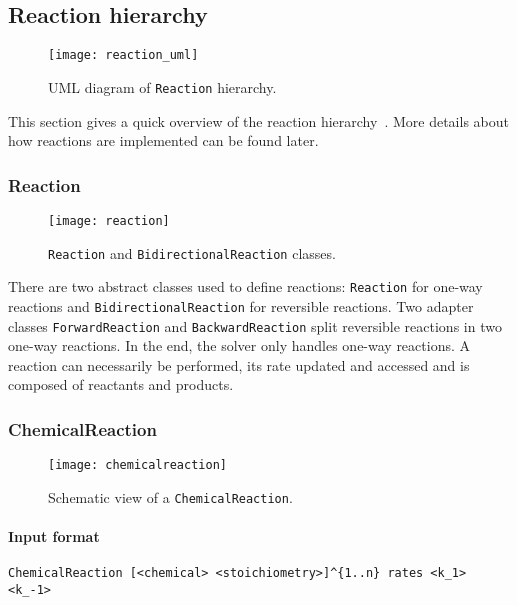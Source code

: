 
\subsection{Reaction hierarchy}

\begin{figure}[!h]
  \centering
  \texttt{[image: reaction\_uml]}
  \caption{UML diagram of \texttt{Reaction} hierarchy.}
  \label{fig:reaction_uml}
\end{figure}

This section gives a quick overview of the reaction hierarchy~. More details about how reactions are implemented can be found later.

\subsubsection{Reaction}

\begin{figure}[!h]
  \centering
  \texttt{[image: reaction]}
  \caption{\texttt{Reaction} and \texttt{BidirectionalReaction} classes.}
  \label{fig:reaction}
\end{figure}

There are two abstract classes used to define reactions: \texttt{Reaction} for one-way reactions and \texttt{BidirectionalReaction} for reversible reactions. Two adapter classes \texttt{ForwardReaction} and \texttt{BackwardReaction} split reversible reactions in two one-way reactions. In the end, the solver only handles one-way reactions. A reaction can necessarily be performed, its rate updated and accessed and is composed of reactants and products.

\subsubsection{ChemicalReaction}

\begin{figure}[!h]
  \centering
  \texttt{[image: chemicalreaction]}
  \caption{Schematic view of a \texttt{ChemicalReaction}.}
  \label{fig:chemical_reaction}
\end{figure}

\paragraph{Input format}
\begin{verbatim}
ChemicalReaction [<chemical> <stoichiometry>]^{1..n} rates <k_1> <k_-1>
\end{verbatim}

